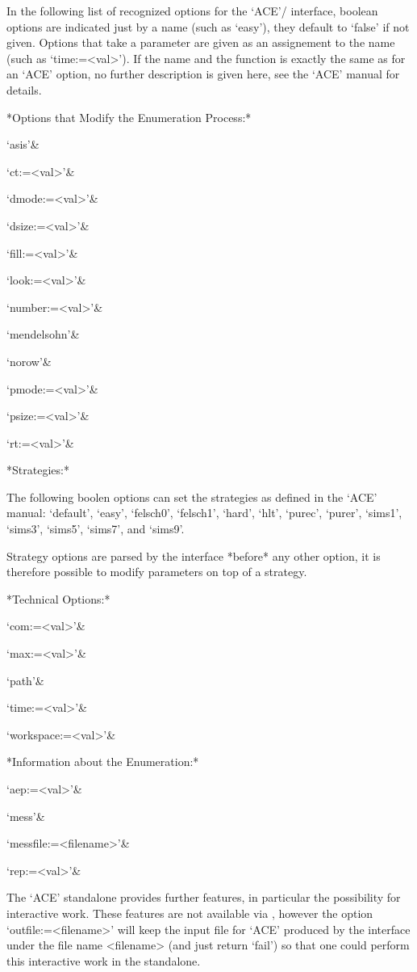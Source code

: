 In the following list of recognized options for
the `ACE'/{\GAP} interface, boolean options are indicated just by a name
(such as `easy'), they default to `false' if not given. Options that take a
parameter are given as an assignement to the name (such as `time:=<val>').
If the name and the function is exactly the same as for an `ACE' option, no
further description is given here, see the `ACE' manual for details.

*Options that Modify the Enumeration Process:*

\beginitems
`asis'&

`ct:=<val>'&

`dmode:=<val>'&

`dsize:=<val>'&

`fill:=<val>'&

`look:=<val>'&

`number:=<val>'&

`mendelsohn'&

`norow'&

`pmode:=<val>'&

`psize:=<val>'&

`rt:=<val>'&

*Strategies:*

The following boolen options can set the strategies as defined in the  `ACE'
manual: `default', `easy', `felsch0', `felsch1', `hard', `hlt', `purec',
`purer', `sims1', `sims3', `sims5', `sims7', and `sims9'.

Strategy options are parsed by the interface *before* any other option, it
is therefore possible to modify parameters on top of a strategy.

*Technical Options:*

\beginitems
`com:=<val>'&

`max:=<val>'&

`path'&

`time:=<val>'&

`workspace:=<val>'&
\enditems

*Information about the Enumeration:*

\beginitems
`aep:=<val>'&

`mess'&

`messfile:=<filename>'&

`rep:=<val>'&
\enditems

The `ACE' standalone provides further features, in particular the possibility
for interactive work. These features are not available via {\GAP}, however
the option `outfile:=<filename>' will  keep the input file for `ACE'
produced by the {\GAP} interface under the file name <filename> (and just
return `fail') so that one could perform this interactive work in the
standalone.

